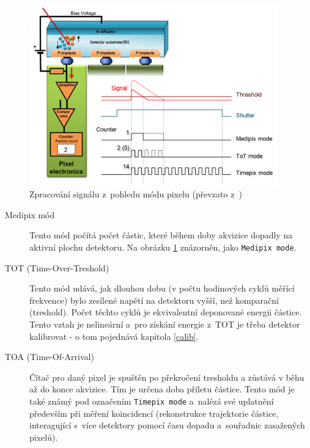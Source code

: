\begin{figure}[th!]
	\begin{center}
		\includegraphics[width=10.75cm]{figures/det_pix.png}
		\caption{Zpracování signálu z~pohledu módu pixelu (převzato z~\cite{PlatkevicDisertace})}
		\label{fig:det:signal_proc}
	\end{center}
\end{figure}

\begin{description}
	\item[Medipix mód] Tento mód počítá počet částic, které během doby akvizice dopadly na aktivní plochu detektoru. Na obrázku \ref{fig:det:signal_proc} znázorněn, jako \texttt{Medipix mode}.
	\item[TOT (Time-Over-Treshold)] Tento mód udává, jak dlouhou dobu (v počtu hodinových cyklů měřící frekvence) bylo zesílené napětí na detektoru vyšší, než komparační (treshold). Počet těchto cyklů je ekvivalentní deponované energii částice. Tento vztah je nelineární a~pro získání energie z~TOT je třeba detektor kalibrovat - o tom pojednává kapitola \ref{calib}.
	\item[TOA (Time-Of-Arrival)] Čítač pro daný pixel je spuštěn po překročení tresholdu a zůstává v běhu až do konce akvizice. Tím je určena doba příletu částice. Tento mód je také známý pod označením \texttt{Timepix mode} a~nalézá své uplatnění především při měření koincidencí (rekonstrukce trajektorie částice, interagující s~více detektory pomocí času dopadu a~souřadnic zasažených pixelů).

\end{description}

